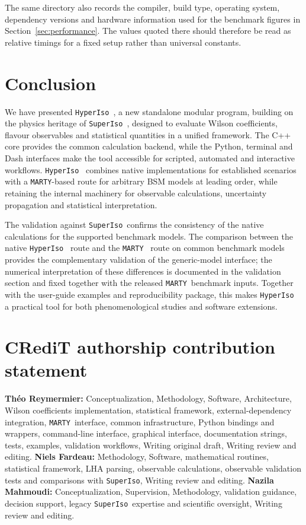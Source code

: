 \documentclass[preprint,11pt]{elsarticle}
\newcommand{\hi}{\texttt{HyperIso}}
\newcommand{\spi}{\texttt{SuperIso}}
\newcommand{\mty}{\texttt{MARTY}}
\begin{document}
The same directory also records the compiler, build type, operating system, dependency versions and hardware information used for the benchmark figures in Section~\ref{sec:performance}.  The values quoted there should therefore be read as relative timings for a fixed setup rather than universal constants.


\section{Conclusion}

We have presented \hi~, a new standalone modular program, building on the physics heritage of \spi~, designed to evaluate Wilson coefficients, flavour observables and statistical quantities in a unified framework. The C++ core provides the common calculation backend, while the Python, terminal and Dash interfaces make the tool accessible for scripted, automated and interactive workflows. \hi~ combines native implementations for established scenarios with a \mty-based route for arbitrary BSM models at leading order, while retaining the internal machinery for observable calculations, uncertainty propagation and statistical interpretation.

The validation against \spi~confirms the consistency of the native calculations for the supported benchmark models. The comparison between the native \hi~ route and the \mty~ route on common benchmark models provides the complementary validation of the generic-model interface; the numerical interpretation of these differences is documented in the validation section and fixed together with the released \mty~benchmark inputs. Together with the user-guide examples and reproducibility package, this makes \hi~ a practical tool for both phenomenological studies and software extensions.

\section*{CRediT authorship contribution statement}
\textbf{Théo Reymermier:} Conceptualization, Methodology, Software, Architecture, Wilson coefficients implementation, statistical framework, external-dependency integration, \mty~interface, common infrastructure, Python bindings and wrappers, command-line interface, graphical interface, documentation strings, tests, examples, validation workflows, Writing original draft, Writing review and editing.  \textbf{Niels Fardeau:} Methodology, Software, mathematical routines, statistical framework, LHA parsing, observable calculations, observable validation tests and comparisons with \spi, Writing review and editing.  \textbf{Nazila Mahmoudi:} Conceptualization, Supervision, Methodology, validation guidance, decision support, legacy \spi~expertise and scientific oversight, Writing review and editing.
\end{document}
